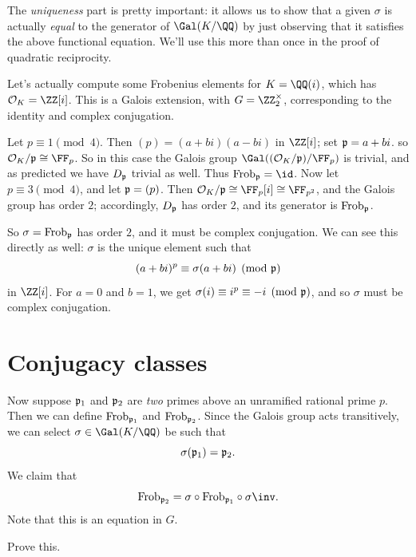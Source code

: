 The \emph{uniqueness} part is pretty important:
it allows us to show that a given $\sigma$ is actually \emph{equal}
to the generator of $\Gal(K/\QQ)$ by just observing that it satisfies
the above functional equation.
We'll use this more than once in the proof of quadratic reciprocity.

\begin{example}
	Let's actually compute some Frobenius elements for $K = \QQ(i)$,
	which has $\OO_K = \ZZ[i]$.
	This is a Galois extension, with $G = \Zm2$, corresponding to the identity
	and complex conjugation.
	\begin{enumerate}[(a)]
		\ii Let $p \equiv 1 \pmod 4$.
		Then $(p) = (a+bi)(a-bi)$ in $\ZZ[i]$; set $\mathfrak p = a + bi$.
		so $\OO_K / \pp \cong \FF_p$.
		So in this case the Galois group $\Gal( (\OO_K/\pp) / \FF_p )$
		is trivial, and as predicted we have $D_\mathfrak p$ trivial as well.
		Thus $\Frob_\pp = \id$.
		\ii Now let $p \equiv 3 \pmod 4$, and let $\mathfrak p = (p)$.
		Then $\OO_K / \pp \cong \FF_p[i] \cong \FF_{p^2}$, and the Galois group has order $2$;
		accordingly, $D_\mathfrak p$ has order $2$, and its generator is $\mathrm{Frob}_\mathfrak p$.

		So $\sigma = \mathrm{Frob}_\mathfrak p$ has order $2$, and it must be complex conjugation.
		We can see this directly as well: $\sigma$ is the unique element such that
		\[ (a+bi)^p \equiv \sigma(a+bi) \pmod{\mathfrak p} \]
		in $\ZZ[i]$.
		For $a=0$ and $b=1$, we get $\sigma(i) \equiv i^p \equiv -i \pmod{\mathfrak p}$,
		and so $\sigma$ must be complex conjugation.
	\end{enumerate}
\end{example}

\section{Conjugacy classes}
Now suppose $\mathfrak p_1$ and $\mathfrak p_2$ are \emph{two} primes above an unramified rational prime $p$.
Then we can define $\mathrm{Frob}_{\mathfrak p_1}$ and $\mathrm{Frob}_{\mathfrak p_2}$.
Since the Galois group acts transitively,
we can select $\sigma \in \Gal(K/\QQ)$ be such that
\[ \sigma(\mathfrak p_1) = \mathfrak p_2. \]
We claim that
\[
	\Frob_{\pp_2} = \sigma \circ \Frob_{\pp_1} \circ \sigma\inv.
\]
Note that this is an equation in $G$.
\begin{ques}
	Prove this.
\end{ques}

